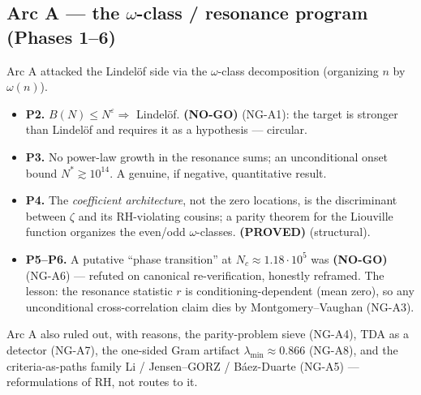 \documentclass[11pt]{article}
\theoremstyle{remark}
\newcommand{\PROVED}{\textbf{(PROVED)}}
\newcommand{\NOGO}{\textbf{(NO-GO)}}
\begin{document}
\subsection{Arc A --- the $\omega$-class / resonance program (Phases 1--6)}
Arc A attacked the Lindel\"of side via the $\omega$-class decomposition (organizing $n$ by
$\omega(n)$).
\begin{itemize}[leftmargin=*]
\item \textbf{P2.} $B(N)\le N^\varepsilon\Rightarrow$ Lindel\"of. \NOGO{} (NG-A1): the target is
stronger than Lindel\"of and requires it as a hypothesis --- circular.
\item \textbf{P3.} No power-law growth in the resonance sums; an unconditional onset bound
$N^*\gtrsim10^{14}$. A genuine, if negative, quantitative result.
\item \textbf{P4.} The \emph{coefficient architecture}, not the zero locations, is the
discriminant between $\zeta$ and its RH-violating cousins; a parity theorem for the Liouville
function organizes the even/odd $\omega$-classes. \PROVED{} (structural).
\item \textbf{P5--P6.} A putative ``phase transition'' at $N_c\approx1.18\cdot10^5$ was
\NOGO{} (NG-A6) --- refuted on canonical re-verification, honestly reframed. The lesson: the
resonance statistic $r$ is conditioning-dependent (mean zero), so any unconditional
cross-correlation claim dies by Montgomery--Vaughan (NG-A3).
\end{itemize}
Arc A also ruled out, with reasons, the parity-problem sieve (NG-A4), TDA as a detector
(NG-A7), the one-sided Gram artifact $\lambda_{\min}\approx0.866$ (NG-A8), and the
criteria-as-paths family Li / Jensen--GORZ / B\'aez-Duarte (NG-A5) --- reformulations of RH,
not routes to it.
\end{document}
